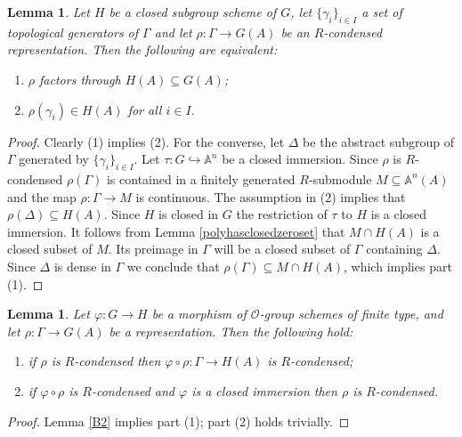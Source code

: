 \documentclass{amsart}
\newtheorem{lem}[prop]{Lemma}
\theoremstyle{definition}
\theoremstyle{remark}
\newcommand{\OO}{\mathcal O}
\begin{document}
\begin{lem}\label{gener_cond} Let $H$ be a closed subgroup scheme of $G$, let $\{\gamma_i\}_{i\in I}$ a 
set of topological generators of $\Gamma$ and let $\rho: \Gamma\rightarrow G(A)$ be an 
$R$-condensed representation. Then the following are equivalent:
\begin{enumerate}
\item $\rho$ factors through $H(A)\subseteq G(A)$;
\item  $\rho(\gamma_i)\in H(A)$ for all $i\in I$. 
\end{enumerate}
\end{lem} 
\begin{proof} Clearly (1) implies (2). For the converse, let $\Delta$ be the abstract subgroup
of $\Gamma$ generated by $\{\gamma_i\}_{i\in I}$. Let $\tau: G\hookrightarrow \mathbb A^n$ 
be a closed immersion. Since $\rho$ is $R$-condensed $\rho(\Gamma)$ is contained in 
a finitely generated $R$-submodule $M \subseteq \mathbb A^n(A)$ and the map $\rho: \Gamma\rightarrow M$ 
is continuous. The assumption in (2) implies that $\rho(\Delta)\subseteq H(A)$. 
Since $H$ is closed in $G$ the restriction of $\tau$ to $H$ is a closed immersion. It follows 
from Lemma \ref{polyhasclosedzeroset} that $M\cap H(A)$ is a closed subset of $M$. Its preimage 
in $\Gamma$ will be a closed subset of $\Gamma$ containing $\Delta$. Since $\Delta$ is dense in 
$\Gamma$ we conclude that $\rho(\Gamma)\subseteq M\cap H(A)$, which implies part (1).
\end{proof}



\begin{lem}\label{cond_rep_funct} Let $\varphi: G\rightarrow H$ be a morphism of $\OO$-group schemes of finite type, 
and let $\rho: \Gamma \rightarrow G(A)$ be a representation. Then the following hold: 
\begin{enumerate}
\item if $\rho$ is $R$-condensed then $\varphi\circ \rho: \Gamma \rightarrow H(A)$ is $R$-condensed;
\item if $\varphi\circ\rho$ is $R$-condensed and $\varphi$ is a closed immersion then $\rho$ is $R$-condensed. 
\end{enumerate}
\end{lem} 
\begin{proof} Lemma \ref{B2} implies part (1);  part (2) holds trivially.
\end{proof}
\end{document}
